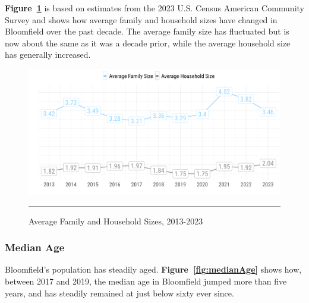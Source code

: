 \noindent \textbf{Figure~\ref{fig:householdSize}} is based on estimates from the 2023 U.S. Census American Community Survey and shows how average family and household sizes have changed in Bloomfield over the past decade. The average family size has fluctuated but is now about the same as it was a decade prior, while the average household size has generally increased.

\begin{figure}[H]
\centering
\begin{framed}
    \caption{Average Family and Household Sizes, 2013-2023}
    \label{fig:householdSize}
    \includegraphics[width=\linewidth]{figures/household_size.png}
    \rule[-5pt]{\linewidth}{0.4pt}
\end{framed}
\end{figure}

\pagebreak
\subsubsection*{Median Age}

\noindent Bloomfield's population has steadily aged. \textbf{Figure~\ref{fig:medianAge}} shows how, between 2017 and 2019, the median age in Bloomfield jumped more than five years, and has steadily remained at just below sixty ever since.

